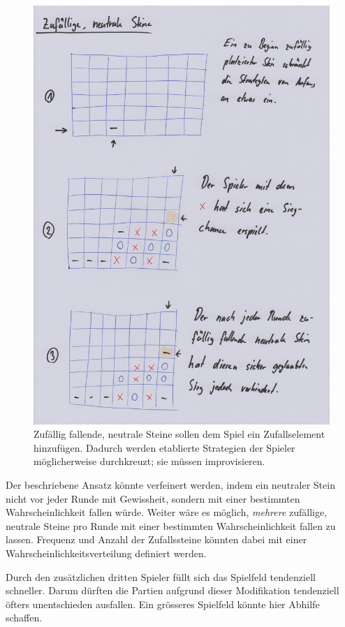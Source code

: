 \documentclass[a4paper,11pt,hidelinks]{scrartcl}
\begin{document}
\begin{figure}
    \centering
    \includegraphics[width=0.9\linewidth]{pics/neutral-papier.jpg}
    \caption{Zufällig fallende, neutrale Steine sollen dem Spiel ein Zufallselement hinzufügen. Dadurch werden etablierte Strategien der Spieler möglicherweise durchkreuzt; sie müssen improvisieren.}
    \label{fig:neutral}
\end{figure}

Der beschriebene Ansatz könnte verfeinert werden, indem ein neutraler Stein nicht vor jeder Runde mit Gewissheit, sondern mit einer bestimmten Wahrscheinlichkeit fallen würde. Weiter wäre es möglich, \textit{mehrere} zufällige, neutrale Steine pro Runde mit einer bestimmten Wahrscheinlichkeit fallen zu lassen. Frequenz und Anzahl der Zufallssteine könnten dabei mit einer Wahrscheinlichkeitsverteilung definiert werden.

Durch den zusätzlichen dritten Spieler füllt sich das Spielfeld tendenziell schneller. Darum dürften die Partien aufgrund dieser Modifikation tendenziell öfters unentschieden ausfallen. Ein grösseres Spielfeld könnte hier Abhilfe schaffen.
\end{document}
